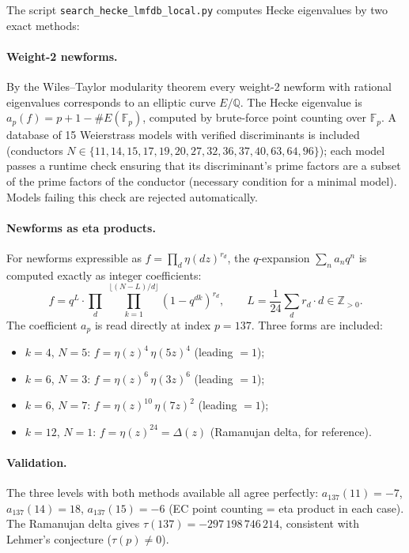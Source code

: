 \documentclass[12pt,a4paper]{article}
\begin{document}
The script \texttt{search\_hecke\_lmfdb\_local.py} computes Hecke eigenvalues
by two exact methods:

\paragraph{Weight-2 newforms.}  By the Wiles--Taylor modularity theorem every
weight-2 newform with rational eigenvalues corresponds to an elliptic curve
$E/\mathbb{Q}$.  The Hecke eigenvalue is $a_p(f) = p + 1 - \#E(\mathbb{F}_p)$,
computed by brute-force point counting over $\mathbb{F}_p$.
A database of 15 Weierstrass models with verified discriminants is included
(conductors $N \in \{11,14,15,17,19,20,27,32,36,37,40,63,64,96\}$);
each model passes a runtime check ensuring that its discriminant's prime
factors are a subset of the prime factors of the conductor (necessary condition
for a minimal model).  Models failing this check are rejected automatically.

\paragraph{Newforms as eta products.}
For newforms expressible as $f = \prod_d \eta(dz)^{r_d}$, the $q$-expansion
$\sum_n a_n q^n$ is computed exactly as integer coefficients:
\begin{equation}
  f = q^L \cdot \prod_{d}\;\prod_{k=1}^{\lfloor (N-L)/d \rfloor} (1-q^{dk})^{r_d},
  \qquad L = \frac{1}{24}\sum_d r_d \cdot d \in \mathbb{Z}_{>0}.
\end{equation}
The coefficient $a_p$ is read directly at index $p = 137$.
Three forms are included:
\begin{itemize}
  \item $k=4$, $N=5$: $f = \eta(z)^4\,\eta(5z)^4$ (leading $= 1$);
  \item $k=6$, $N=3$: $f = \eta(z)^6\,\eta(3z)^6$ (leading $= 1$);
  \item $k=6$, $N=7$: $f = \eta(z)^{10}\,\eta(7z)^2$ (leading $= 1$);
  \item $k=12$, $N=1$: $f = \eta(z)^{24} = \Delta(z)$ (Ramanujan delta, for reference).
\end{itemize}

\paragraph{Validation.}
The three levels with both methods available all agree perfectly:
$a_{137}(11) = -7$, $a_{137}(14) = 18$, $a_{137}(15) = -6$
(EC point counting = eta product in each case).
The Ramanujan delta gives $\tau(137) = -297\,198\,746\,214$, consistent with
Lehmer's conjecture ($\tau(p)\ne 0$).
\end{document}
